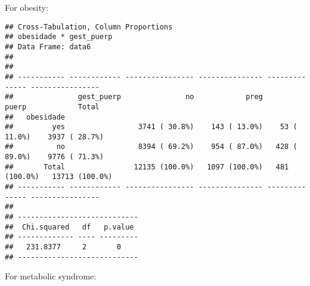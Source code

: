 \documentclass[
]{article}
\newenvironment{Shaded}{\begin{snugshade}}{\end{snugshade}}
\newcommand{\DataTypeTok}[1]{\textcolor[rgb]{0.13,0.29,0.53}{#1}}
\newcommand{\KeywordTok}[1]{\textcolor[rgb]{0.13,0.29,0.53}{\textbf{#1}}}
\newcommand{\NormalTok}[1]{#1}
\newcommand{\OperatorTok}[1]{\textcolor[rgb]{0.81,0.36,0.00}{\textbf{#1}}}
\newcommand{\OtherTok}[1]{\textcolor[rgb]{0.56,0.35,0.01}{#1}}
\newcommand{\StringTok}[1]{\textcolor[rgb]{0.31,0.60,0.02}{#1}}
\begin{document}
For obesity:

\begin{Shaded}
\end{Shaded}

\begin{verbatim}
## Cross-Tabulation, Column Proportions  
## obesidade * gest_puerp  
## Data Frame: data6  
## 
## 
## ----------- ------------ ---------------- --------------- -------------- ----------------
##               gest_puerp               no            preg          puerp            Total
##   obesidade                                                                              
##         yes                 3741 ( 30.8%)    143 ( 13.0%)    53 ( 11.0%)    3937 ( 28.7%)
##          no                 8394 ( 69.2%)    954 ( 87.0%)   428 ( 89.0%)    9776 ( 71.3%)
##       Total                12135 (100.0%)   1097 (100.0%)   481 (100.0%)   13713 (100.0%)
## ----------- ------------ ---------------- --------------- -------------- ----------------
## 
## ----------------------------
##  Chi.squared   df   p.value 
## ------------- ---- ---------
##   231.8377     2       0    
## ----------------------------
\end{verbatim}

For metabolic syndrome:

\begin{Shaded}
\end{Shaded}
\end{document}
